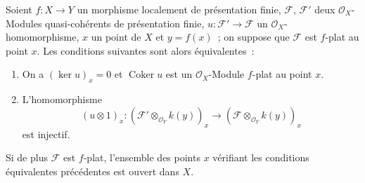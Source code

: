 
\begin{proposition}[11.3.7]
\label{IV.11.3.7-fr}
Soient $f:X\to Y$ un morphisme localement de présentation finie,
$\mathcal F$, $\mathcal F'$ deux $\mathcal O_X$-Modules quasi-cohérents de
présentation finie, $u:\mathcal F'\to\mathcal F$ un
$\mathcal O_X$-homomorphisme, $x$ un point de $X$ et $y=f(x)$~; on suppose que
$\mathcal F$ est $f$-plat au point $x$. Les conditions suivantes sont alors
équivalentes~:
\begin{enumerate}[label=\emph{\alph*)}]
\item On a $(\ker u)_x=0$ et $\operatorname{Coker}u$ est un
$\mathcal O_X$-Module $f$-plat au point $x$.
\item L'homomorphisme
\[
(u\otimes1)_x:(\mathcal F'\otimes_{\mathcal O_Y}k(y))_x
\longrightarrow(\mathcal F\otimes_{\mathcal O_Y}k(y))_x
\]
est injectif.
\end{enumerate}
Si de plus $\mathcal F$ est $f$-plat, l'ensemble des points $x$ vérifiant les
conditions équivalentes précédentes est ouvert dans $X$.
\end{proposition}

